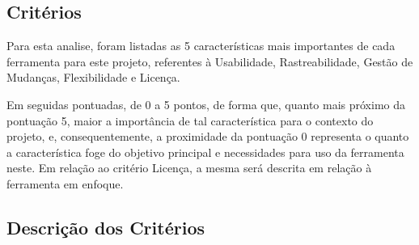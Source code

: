 \subsection {Critérios}

Para esta analise, foram listadas as 5 características mais importantes de cada ferramenta para este projeto, referentes à Usabilidade, Rastreabilidade, Gestão de Mudanças, Flexibilidade e Licença.

Em seguidas pontuadas, de 0 a 5 pontos, de forma que, quanto mais próximo da pontuação 5, maior a importância de tal característica para o contexto do projeto, e, consequentemente, a proximidade da pontuação 0 representa o quanto a característica foge do objetivo principal e necessidades para uso da ferramenta neste. Em relação ao critério Licença, a mesma será descrita em relação à ferramenta em enfoque.

\subsection {Descrição dos Critérios}

